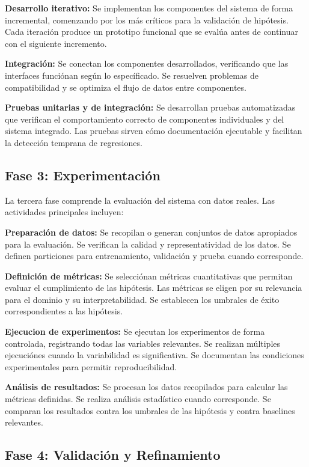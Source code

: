 \documentclass[12pt,a4paper,twoside]{book}
\begin{document}
\textbf{Desarrollo iterativo:} Se implementan los componentes del sistema de forma incremental, comenzando por los más críticos para la validación de hipótesis. Cada iteración produce un prototipo funcional que se evalúa antes de continuar con el siguiente incremento.

\textbf{Integración:} Se conectan los componentes desarrollados, verificando que las interfaces funciónan según lo específicado. Se resuelven problemas de compatibilidad y se optimiza el flujo de datos entre componentes.

\textbf{Pruebas unitarias y de integración:} Se desarrollan pruebas automatizadas que verifican el comportamiento correcto de componentes individuales y del sistema integrado. Las pruebas sirven cómo documentación ejecutable y facilitan la detección temprana de regresiones.

\subsection{Fase 3: Experimentación}

La tercera fase comprende la evaluación del sistema con datos reales. Las actividades principales incluyen:

\textbf{Preparación de datos:} Se recopilan o generan conjuntos de datos apropiados para la evaluación. Se verifican la calidad y representatividad de los datos. Se definen particiones para entrenamiento, validación y prueba cuando corresponde.

\textbf{Definición de métricas:} Se selecciónan métricas cuantitativas que permitan evaluar el cumplimiento de las hipótesis. Las métricas se eligen por su relevancia para el dominio y su interpretabilidad. Se establecen los umbrales de éxito correspondientes a las hipótesis.

\textbf{Ejecucion de experimentos:} Se ejecutan los experimentos de forma controlada, registrando todas las variables relevantes. Se realizan múltiples ejecuciónes cuando la variabilidad es significativa. Se documentan las condiciones experimentales para permitir reproducibilidad.

\textbf{Análisis de resultados:} Se procesan los datos recopilados para calcular las métricas definidas. Se realiza análisis estadístico cuando corresponde. Se comparan los resultados contra los umbrales de las hipótesis y contra baselines relevantes.

\subsection{Fase 4: Validación y Refinamiento}
\end{document}
